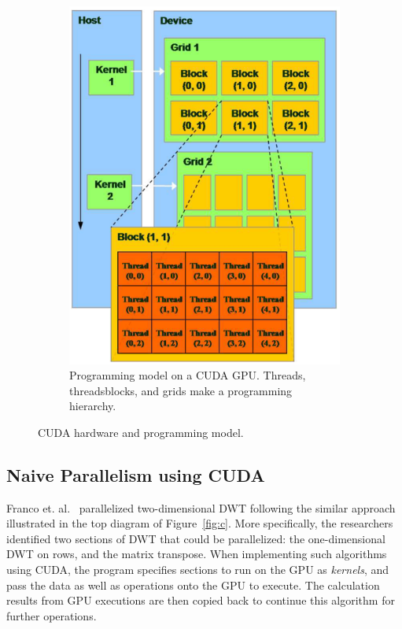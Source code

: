 \begin{figure}
\begin{subfigure}[b]{0.42\textwidth}
        \includegraphics[width=\textwidth]{fig/cuda-pro.png}
        \caption{Programming model on a CUDA GPU.
                 Threads, threadsblocks, and grids make a programming 
                 hierarchy.}
        \label{fig:cuda-pro}
    \end{subfigure}
%
    \caption{CUDA hardware and programming model.}
\end{figure}



\subsection{Naive Parallelism using CUDA}
\label{sec:cuda-naive}
%
Franco et. al.~\cite{franco2009parallel} parallelized two-dimensional 
DWT following the similar approach
illustrated in the top diagram of Figure~\ref{fig:c}.
%
More specifically, the researchers identified two sections of DWT
that could be parallelized: the one-dimensional DWT on rows, and the
matrix transpose.
%
When implementing such algorithms using CUDA, the program specifies
sections to run on the GPU as \textit{kernels}, and pass the data 
as well as operations onto the GPU to execute.
%
The calculation results from GPU executions are then copied back
to continue this algorithm for further operations.

